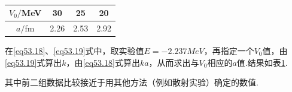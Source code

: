 \begin{table}[!h]
	\begin{center}
		\caption{}\label{lab.5-2}
		\setlength{\tabcolsep}{8mm}	%
		\begin{tabular}{c|c|c|c}
			\hline 
			$V_{0}/$\si{MeV} & 30 & 25 & 20 	\\	\hline
			$a/$\si{fm} & 2.26 & 2.53 & 2.92 	\\	\hline
		\end{tabular}
	\end{center}
\end{table}
在\eqref{eq53.18}、\eqref{eq53.19}式中，取实验值$E=\num{-2.237} \si{MeV}$，再指定一个$V_{0}$值，由\eqref{eq53.19}式算出$k$，由\eqref{eq53.18}式算出$ka$，从而求出与$V_{0}$相应的$a$值.结果如表\ref{lab.5-2}.

其中前二组数据比较接近于用其他方法（例如散射实验）确定的数值.




